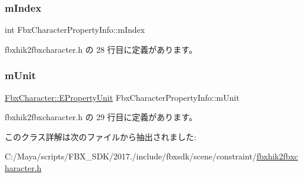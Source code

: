 \subsubsection{\texorpdfstring{m\+Index}{mIndex}}
{\footnotesize\ttfamily int Fbx\+Character\+Property\+Info\+::m\+Index}



 fbxhik2fbxcharacter.\+h の 28 行目に定義があります。

\mbox{\label{class_fbx_character_property_info_ad22617f1c6c63b559f7da55af1519086}} 
\subsubsection{\texorpdfstring{m\+Unit}{mUnit}}
{\footnotesize\ttfamily \hyperlink{class_fbx_character_aa48fb13a1c63e6a69ce9fa251993f8d5}{Fbx\+Character\+::\+E\+Property\+Unit} Fbx\+Character\+Property\+Info\+::m\+Unit}



 fbxhik2fbxcharacter.\+h の 29 行目に定義があります。



このクラス詳解は次のファイルから抽出されました\+:\begin{DoxyCompactItemize}
\item 
C\+:/\+Maya/scripts/\+F\+B\+X\+\_\+\+S\+D\+K/2017./include/fbxsdk/scene/constraint/\hyperlink{fbxhik2fbxcharacter_8h}{fbxhik2fbxcharacter.\+h}\end{DoxyCompactItemize}
